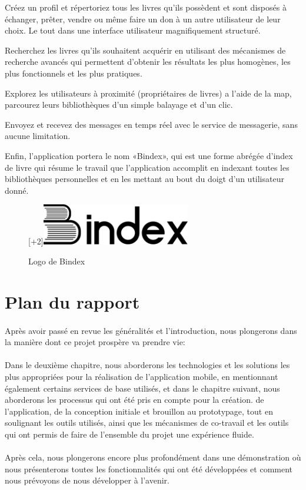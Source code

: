 \begin{list}{•}{}
	\item Créez un profil et répertoriez tous les livres qu’ils possèdent et sont disposés à échanger, prêter, vendre ou même faire un don à un autre utilisateur de leur choix. Le tout dans une interface utilisateur magnifiquement structuré.
	\item Recherchez les livres qu'ils souhaitent acquérir en utilisant des mécanismes de recherche avancés qui permettent d'obtenir les résultats les plus homogènes, les plus fonctionnels et les plus pratiques.
	\item Explorez les utilisateurs à proximité (propriétaires de livres) a l'aide de la map, parcourez leurs bibliothèques d'un simple balayage et d'un clic.
	\item Envoyez et recevez des messages en temps réel avec le service de messagerie, sans aucune limitation.
\end{list}

Enfin, l’application portera le nom «Bindex», qui est une forme abrégée d’index de livre qui résume le travail que l’application accomplit en indexant toutes les bibliothèques personnelles et en les mettant au bout du doigt d’un utilisateur donné.

\begin{figure}[h]
	\begin{center}
		\raisebox{0pt}[\dimexpr\height+2\baselineskip\relax]{\includegraphics[width=6.5cm]{Images/chapter1/bindexLogo.png}}
		\caption{Logo de Bindex}
	\end{center}
\end{figure}

\section{Plan du rapport}
\paragraph*{}
Après avoir passé en revue les généralités et l’introduction, nous plongerons dans la manière dont ce projet prospère va prendre vie:
\paragraph*{}
Dans le deuxième chapitre, nous aborderons les technologies et les solutions les plus appropriées pour la réalisation de l’application mobile, en mentionnant également certains services de base utilisés, et dans le chapitre suivant, nous aborderons les processus qui ont été pris en compte pour la création. de l’application, de la conception initiale et brouillon au prototypage, tout en soulignant les outils utilisés, ainsi que les mécanismes de co-travail et les outils qui ont permis de faire de l’ensemble du projet une expérience fluide.
\paragraph*{}
Après cela, nous plongerons encore plus profondément dans une démonstration où nous présenterons toutes les fonctionnalités qui ont été développées et comment nous prévoyons de nous développer à l’avenir.

